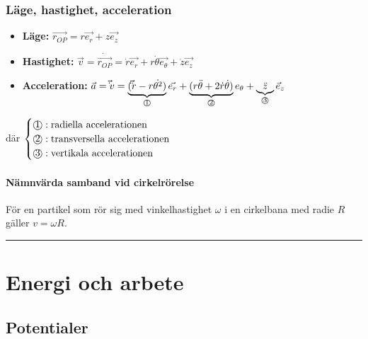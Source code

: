 \documentclass{article}
\newenvironment{ankiflashcard}[1]{}{}
\newcommand{\ruler}{
\rule{0.5\textwidth}{0.5pt}
}
\newcommand{\numbercircle}[1]{
\text{\textcircled{#1}}
}
\newcommand{\numbercirclewithunderbrace}[2]{
\underbrace{#1}_{\numbercircle{#2}}
}
\begin{document}
\begin{paracol}{2}
\begin{ankiflashcard}{Definiera läge, hastighet och acceleration i cylinderkoordinater.}
    
\subsubsection{Läge, hastighet, acceleration}
\begin{itemize}
    \item \textbf{Läge:} $\vec{r_{OP}}=r \vec{e_r}+z\vec{e_z}$
    \item \textbf{Hastighet:} $\vec v = \dot \vec{r_{OP}}=\dot r \vec{e_r} + r\dot \theta \vec{e_\theta}+\dot z\vec{e_z}$
    \item \textbf{Acceleration:} $\vec a = \vec \dot v = \numbercirclewithunderbrace{(\vec \ddot r- r\dot{\theta^2})}{1}\vec{e_r}
    +\numbercirclewithunderbrace{(r\ddot \theta + 2\dot r\dot \theta)}{2}e_\theta +\numbercirclewithunderbrace{\ddot z}{3} \vec e_z$
\end{itemize}
där $\begin{cases}
\numbercircle{1}:\space\text{radiella accelerationen}\\
\numbercircle{2}:\space\text{transversella accelerationen}\\
\numbercircle{3}:\space\text{vertikala accelerationen}
\end{cases}$
\end{ankiflashcard}


\paragraph{Nämnvärda samband vid cirkelrörelse}


\begin{ankiflashcard}{Ange sambandet mellan vinkelhastighet och radie vid cirkelrörelse.}
    
För en partikel som rör sig med vinkelhastighet $\omega$ i en cirkelbana med radie $R$ gäller $v=\omega R$.
\end{ankiflashcard}

\ruler
\section{Energi och arbete}
\subsection{Potentialer}


\end{paracol}
\end{document}
